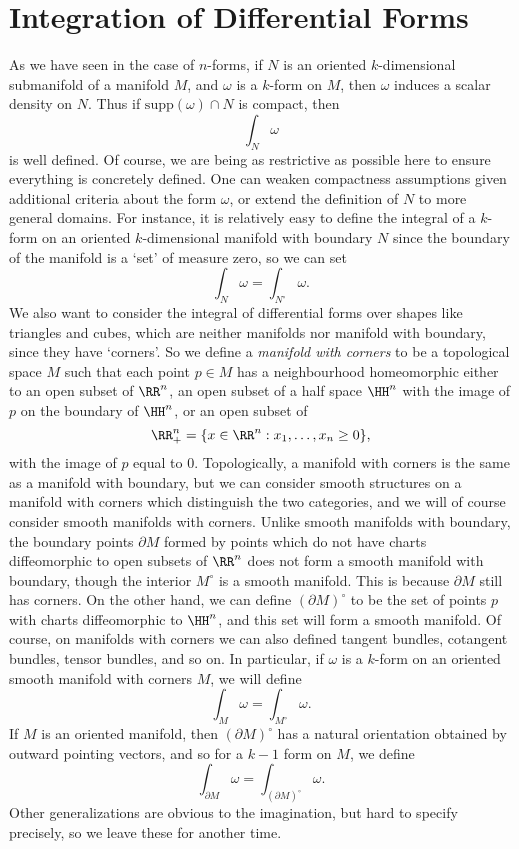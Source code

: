 \section{Integration of Differential Forms}

As we have seen in the case of $n$-forms, if $N$ is an oriented $k$-dimensional submanifold of a manifold $M$, and $\omega$ is a $k$-form on $M$, then $\omega$ induces a scalar density on $N$. Thus if $\text{supp}(\omega) \cap N$ is compact, then
%
\[ \int_N \omega \]
%
is well defined. Of course, we are being as restrictive as possible here to ensure everything is concretely defined. One can weaken compactness assumptions given additional criteria about the form $\omega$, or extend the definition of $N$ to more general domains. For instance, it is relatively easy to define the integral of a $k$-form on an oriented $k$-dimensional manifold with boundary $N$ since the boundary of the manifold is a `set' of measure zero, so we can set
%
\[ \int_N \omega = \int_{N^\circ} \omega. \]
%
We also want to consider the integral of differential forms over shapes like triangles and cubes, which are neither manifolds nor manifold with boundary, since they have `corners'. So we define a \emph{manifold with corners} to be a topological space $M$ such that each point $p \in M$ has a neighbourhood homeomorphic either to an open subset of $\RR^n$, an open subset of a half space $\HH^n$ with the image of $p$ on the boundary of $\HH^n$, or an open subset of
%
\[ \RR^n_+ = \{ x \in \RR^n: x_1, \dots, x_n \geq 0 \}, \]
%
with the image of $p$ equal to $0$. Topologically, a manifold with corners is the same as a manifold with boundary, but we can consider smooth structures on a manifold with corners which distinguish the two categories, and we will of course consider smooth manifolds with corners. Unlike smooth manifolds with boundary, the boundary points $\partial M$ formed by points which do not have charts diffeomorphic to open subsets of $\RR^n$ does not form a smooth manifold with boundary, though the interior $M^\circ$ is a smooth manifold. This is because $\partial M$ still has corners. On the other hand, we can define $(\partial M)^\circ$ to be the set of points $p$ with charts diffeomorphic to $\HH^n$, and this set will form a smooth manifold. Of course, on manifolds with corners we can also defined tangent bundles, cotangent bundles, tensor bundles, and so on. In particular, if $\omega$ is a $k$-form on an oriented smooth manifold with corners $M$, we will define
%
\[ \int_M \omega = \int_{M^\circ} \omega. \]
%
If $M$ is an oriented manifold, then $(\partial M)^\circ$ has a natural orientation obtained by outward pointing vectors, and so for a $k-1$ form on $M$, we define
%
\[ \int_{\partial M} \omega = \int_{(\partial M)^\circ} \omega. \]
%
Other generalizations are obvious to the imagination, but hard to specify precisely, so we leave these for another time.

